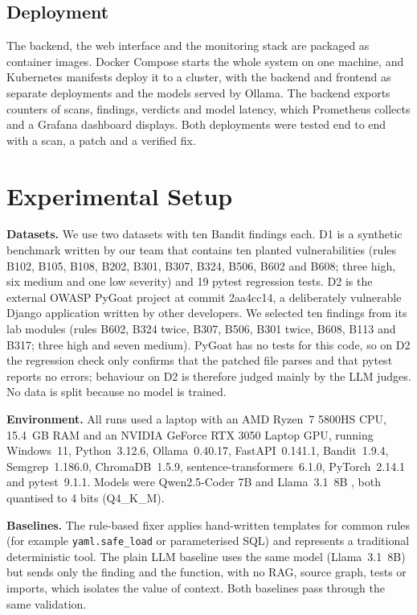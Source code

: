 \documentclass[12pt,onecolumn,draftclsnofoot]{IEEEtran}
\begin{document}
\subsection{Deployment}
The backend, the web interface and the monitoring stack are packaged as container images. Docker Compose starts the whole system on one machine, and Kubernetes manifests deploy it to a cluster, with the backend and frontend as separate deployments and the models served by Ollama. The backend exports counters of scans, findings, verdicts and model latency, which Prometheus collects and a Grafana dashboard displays. Both deployments were tested end to end with a scan, a patch and a verified fix.

\section{Experimental Setup}

\textbf{Datasets.} We use two datasets with ten Bandit findings each. D1 is a synthetic benchmark written by our team that contains ten planted vulnerabilities (rules B102, B105, B108, B202, B301, B307, B324, B506, B602 and B608; three high, six medium and one low severity) and 19 pytest regression tests. D2 is the external OWASP PyGoat project \cite{pygoat} at commit 2aa4cc14, a deliberately vulnerable Django application written by other developers. We selected ten findings from its lab modules (rules B602, B324 twice, B307, B506, B301 twice, B608, B113 and B317; three high and seven medium). PyGoat has no tests for this code, so on D2 the regression check only confirms that the patched file parses and that pytest reports no errors; behaviour on D2 is therefore judged mainly by the LLM judges. No data is split because no model is trained.

\textbf{Environment.} All runs used a laptop with an AMD Ryzen~7 5800HS CPU, 15.4~GB RAM and an NVIDIA GeForce RTX 3050 Laptop GPU, running Windows~11, Python~3.12.6, Ollama~0.40.17, FastAPI~0.141.1, Bandit~1.9.4, Semgrep~1.186.0, ChromaDB~1.5.9, sentence-transformers~6.1.0, PyTorch~2.14.1 and pytest~9.1.1. Models were Qwen2.5-Coder 7B \cite{hui2024qwen25coder} and Llama~3.1~8B \cite{dubey2024llama3}, both quantised to 4 bits (Q4\_K\_M).

\textbf{Baselines.} The rule-based fixer applies hand-written templates for common rules (for example \texttt{yaml.safe\_load} or parameterised SQL) and represents a traditional deterministic tool. The plain LLM baseline uses the same model (Llama~3.1~8B) but sends only the finding and the function, with no RAG, source graph, tests or imports, which isolates the value of context. Both baselines pass through the same validation.
\end{document}
